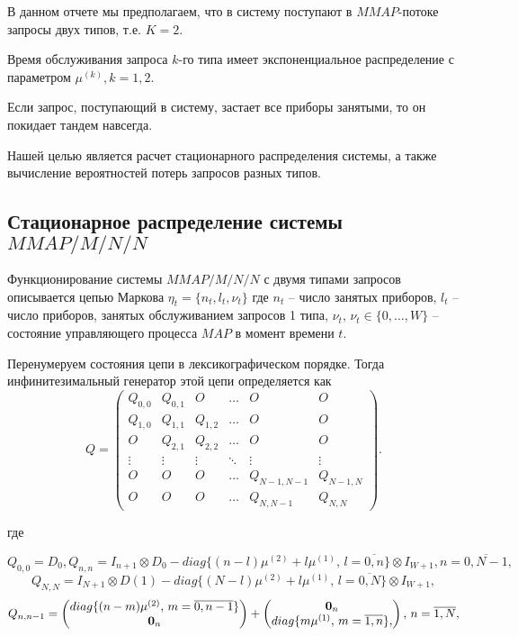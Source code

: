 \documentclass[12pt, a4paper]{article}
\begin{document}
	В данном отчете мы предполагаем, что в систему поступают в $MMAP$-потоке запросы двух типов, т.е. $K=2$.
	
	Время обслуживания запроса $k$-го типа   имеет экспоненциальное распределение
	с параметром $\mu^{(k)},  k=1,2.$
	
	Если запрос, поступающий  в систему,  застает  все приборы занятыми, то он покидает тандем
	навсегда.
	
	Нашей целью является
	расчет стационарного распределения системы, а также
	вычисление  вероятностей потерь запросов разных типов.
	
	
	
	
	
	
	
	\subsection{ Стационарное распределение системы  $MMAP/M/N/N$}
	
	
	
	Функционирование системы  $MMAP/M/N/N$ с двумя типами запросов описывается цепью Маркова
	$\eta_t= \{n_t, l_t, \nu_t\}$ где $n_t$ -- число занятых приборов,  $l_t$ -- число  приборов, занятых обслуживанием 
	запросов 1 типа, $\nu_t,\,\nu_t \in \{0,\dots,W\}$   -- состояние управляющего
	процесса $MAP$ в  момент времени $t.$
	
	Перенумеруем состояния цепи  в лексикографическом порядке. Тогда
	инфинитезимальный  генератор этой цепи определяется как
	$$
	Q= \left(\begin{array}{cccccc}
	Q_{0,0} & Q_{0,1} & O & \ldots & O & O\\
	Q_{1,0}& Q_{1,1} & Q_{1,2} &  \ldots & O & O\\
	O & Q_{2,1} & Q_{2,2}&  \ldots & O & O\\
	\vdots & \vdots & \vdots &  \ddots & \vdots & \vdots\\
	O & O & O & \ldots &Q_{N-1, N-1} &Q_{N-1, N} \\
	O & O & O & \ldots & Q_{N, N-1} & Q_{N, N}\end{array}\right).
	$$
	
	где
	
	$$
	Q_{0,0}=D_0, Q_{n,n}=I_{n+1}\otimes D_0-diag\{(n-l)\mu^{(2)}+l\mu^{(1)},\, l=\overline{0, n}\}\otimes  I_{W+1}, 
	n=\overline{0, N-1},
	$$
	$$
	Q_{N, N}=I_{N+1}\otimes D(1)-diag\{(N-l)\mu^{(2)}+l\mu^{(1)},\, l=\overline{0, N}\}\otimes  I_{W+1},
	$$
	$$
	Q_{n, n-1}=\left(\begin{matrix}
	diag\{(n-m)\mu^{(2)},\, m=\overline{0, n-1}\}\\
	{\bf 0}_n
	\end{matrix}\right)
	+\left(\begin{matrix}
	{\bf 0}_n\\
	diag\{m\mu^{(1)},\, m=\overline{1, n}\},
	\end{matrix}\right), \, n=\overline{1, N},
	$$
	
\end{document}
